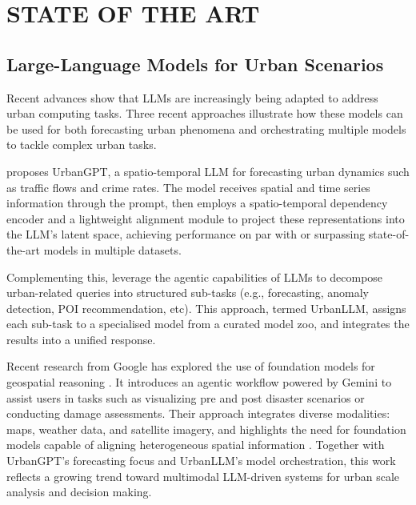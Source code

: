 \chapter{ STATE OF THE ART}


\section{Large-Language Models for Urban Scenarios}

Recent advances show that LLMs are increasingly being adapted to address urban computing tasks. Three recent approaches illustrate how these models can be used for both forecasting urban phenomena and orchestrating multiple models to tackle complex urban tasks.

\cite{Li2024UrbanGPT} proposes UrbanGPT, a spatio-temporal LLM for forecasting urban dynamics such as traffic flows and crime rates. The model receives spatial and time series information through the prompt, then employs a spatio-temporal dependency encoder and a lightweight alignment module to project these representations into the LLM's latent space, achieving performance on par with or surpassing state-of-the-art models in multiple datasets. 

Complementing this, \cite{Jiang2024UrbanLLM} leverage the agentic capabilities of LLMs to decompose urban-related queries into structured sub-tasks (e.g., forecasting, anomaly detection, POI recommendation, etc). This approach, termed UrbanLLM, assigns each sub-task to a specialised model from a curated model zoo, and integrates the results into a unified response.


Recent research from Google has explored the use of foundation models for geospatial reasoning \cite{2025GoogleGeospatialReasoning}. It introduces an agentic workflow powered by Gemini to assist users in tasks such as visualizing pre and post disaster scenarios or conducting damage assessments. Their approach integrates diverse modalities: maps, weather data, and satellite imagery, and highlights the need for foundation models capable of aligning heterogeneous spatial information . Together with UrbanGPT's forecasting focus and UrbanLLM's model orchestration, this work reflects a growing trend toward multimodal LLM-driven systems for urban scale analysis and decision making.


